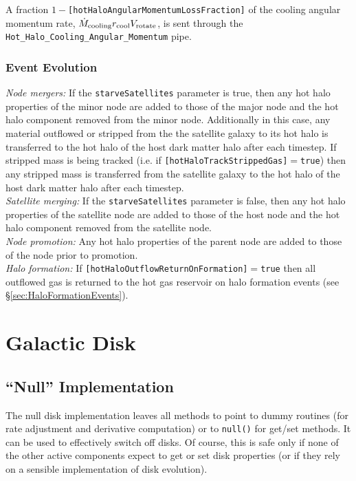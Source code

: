 A fraction $1-${\tt [hotHaloAngularMomentumLossFraction]} of the cooling angular momentum rate, $\dot{M}_{\rm cooling} r_{\rm cool} V_{\rm rotate}$, is sent through the {\tt Hot\_Halo\_Cooling\_Angular\_Momentum} pipe.

\subsubsection{Event Evolution}

\noindent\emph{Node mergers:} If the {\tt starveSatellites} parameter is true, then any hot halo properties of the minor \gls{node} are added to those of the major \gls{node} and the hot halo \gls{component} removed from the minor node. Additionally in this case, any material outflowed or stripped from the the satellite galaxy to its hot halo is transferred to the hot halo of the host dark matter halo after each timestep. If stripped mass is being tracked (i.e. if {\tt [hotHaloTrackStrippedGas]}$=${\tt true}) then any stripped mass is transferred from the satellite galaxy to the hot halo of the host dark matter halo after each timestep.\\

\noindent\emph{Satellite merging:} If the {\tt starveSatellites} parameter is false, then any hot halo properties of the satellite \gls{node} are added to those of the host \gls{node} and the hot halo \gls{component} removed from the satellite node.\\

\noindent\emph{Node promotion:} Any hot halo properties of the parent \gls{node} are added to those of the \gls{node} prior to promotion.\\

\noindent\emph{Halo formation:} If {\tt [hotHaloOutflowReturnOnFormation]}$=${\tt true} then all outflowed gas is returned to the hot gas reservoir on halo formation events (see \S\ref{sec:HaloFormationEvents}).\\

\section{Galactic Disk}

\subsection{``Null'' Implementation}

The null disk implementation leaves all methods to point to dummy routines (for rate adjustment and derivative computation) or to {\tt null()} for get/set methods. It can be used to effectively switch off disks. Of course, this is safe only if none of the other active components expect to get or set disk properties (or if they rely on a sensible implementation of disk evolution).

